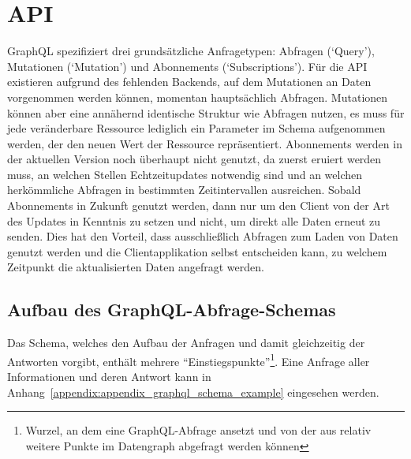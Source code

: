 \section{API}
GraphQL spezifiziert drei grundsätzliche Anfragetypen: Abfragen (`Query'), Mutationen (`Mutation') und Abonnements (`Subscriptions'). Für die API existieren aufgrund des fehlenden Backends, auf dem Mutationen an Daten vorgenommen werden können, momentan hauptsächlich Abfragen. Mutationen können aber eine annähernd identische Struktur wie Abfragen nutzen, es muss für jede veränderbare Ressource lediglich ein Parameter im Schema aufgenommen werden, der den neuen Wert der Ressource repräsentiert. Abonnements werden in der aktuellen Version noch überhaupt nicht genutzt, da zuerst eruiert werden muss, an welchen Stellen Echtzeitupdates notwendig sind und an welchen herkömmliche Abfragen in bestimmten Zeitintervallen ausreichen. Sobald Abonnements in Zukunft genutzt werden, dann nur um den Client von der Art des Updates in Kenntnis zu setzen und nicht, um direkt alle Daten erneut zu senden. Dies hat den Vorteil, dass ausschließlich Abfragen zum Laden von Daten genutzt werden und die Clientapplikation selbst entscheiden kann, zu welchem Zeitpunkt die aktualisierten Daten angefragt werden.

\subsection{Aufbau des GraphQL-Abfrage-Schemas}\label{subsec:graphql_schema}
Das Schema, welches den Aufbau der Anfragen und damit gleichzeitig der Antworten vorgibt, enthält mehrere ``Einstiegspunkte''\footnote{Wurzel, an dem eine GraphQL-Abfrage ansetzt und von der aus relativ weitere Punkte im Datengraph abgefragt werden können}. Eine Anfrage aller Informationen und deren Antwort kann in Anhang~\ref{appendix:appendix_graphql_schema_example} eingesehen werden.

